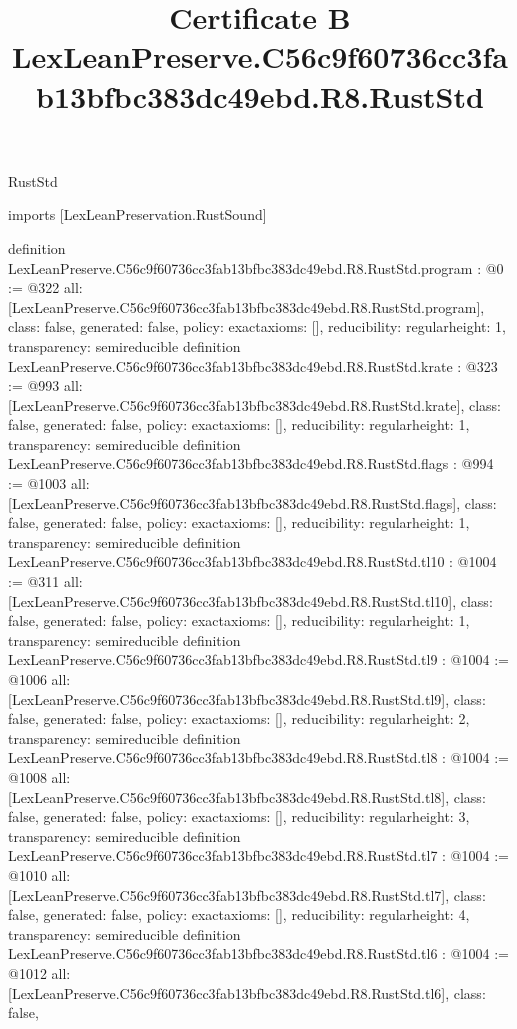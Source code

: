 \begin{lexlean}{RustStd}
\title{Certificate B LexLeanPreserve.C56c9f60736cc3fab13bfbc383dc49ebd.R8.RustStd}
\begin{coremodule}
imports [LexLeanPreservation.RustSound]

definition LexLeanPreserve.C56c9f60736cc3fab13bfbc383dc49ebd.R8.RustStd.program : @0 := @322 {
  all: [LexLeanPreserve.C56c9f60736cc3fab13bfbc383dc49ebd.R8.RustStd.program],
  class: false,
  generated: false,
  policy: exact{axioms: []},
  reducibility: regular{height: 1},
  transparency: semireducible
}
definition LexLeanPreserve.C56c9f60736cc3fab13bfbc383dc49ebd.R8.RustStd.krate : @323 := @993 {
  all: [LexLeanPreserve.C56c9f60736cc3fab13bfbc383dc49ebd.R8.RustStd.krate],
  class: false,
  generated: false,
  policy: exact{axioms: []},
  reducibility: regular{height: 1},
  transparency: semireducible
}
definition LexLeanPreserve.C56c9f60736cc3fab13bfbc383dc49ebd.R8.RustStd.flags : @994 := @1003 {
  all: [LexLeanPreserve.C56c9f60736cc3fab13bfbc383dc49ebd.R8.RustStd.flags],
  class: false,
  generated: false,
  policy: exact{axioms: []},
  reducibility: regular{height: 1},
  transparency: semireducible
}
definition LexLeanPreserve.C56c9f60736cc3fab13bfbc383dc49ebd.R8.RustStd.tl10 : @1004 := @311 {
  all: [LexLeanPreserve.C56c9f60736cc3fab13bfbc383dc49ebd.R8.RustStd.tl10],
  class: false,
  generated: false,
  policy: exact{axioms: []},
  reducibility: regular{height: 1},
  transparency: semireducible
}
definition LexLeanPreserve.C56c9f60736cc3fab13bfbc383dc49ebd.R8.RustStd.tl9 : @1004 := @1006 {
  all: [LexLeanPreserve.C56c9f60736cc3fab13bfbc383dc49ebd.R8.RustStd.tl9],
  class: false,
  generated: false,
  policy: exact{axioms: []},
  reducibility: regular{height: 2},
  transparency: semireducible
}
definition LexLeanPreserve.C56c9f60736cc3fab13bfbc383dc49ebd.R8.RustStd.tl8 : @1004 := @1008 {
  all: [LexLeanPreserve.C56c9f60736cc3fab13bfbc383dc49ebd.R8.RustStd.tl8],
  class: false,
  generated: false,
  policy: exact{axioms: []},
  reducibility: regular{height: 3},
  transparency: semireducible
}
definition LexLeanPreserve.C56c9f60736cc3fab13bfbc383dc49ebd.R8.RustStd.tl7 : @1004 := @1010 {
  all: [LexLeanPreserve.C56c9f60736cc3fab13bfbc383dc49ebd.R8.RustStd.tl7],
  class: false,
  generated: false,
  policy: exact{axioms: []},
  reducibility: regular{height: 4},
  transparency: semireducible
}
definition LexLeanPreserve.C56c9f60736cc3fab13bfbc383dc49ebd.R8.RustStd.tl6 : @1004 := @1012 {
  all: [LexLeanPreserve.C56c9f60736cc3fab13bfbc383dc49ebd.R8.RustStd.tl6],
  class: false,
}
\end{coremodule}
\end{lexlean}
